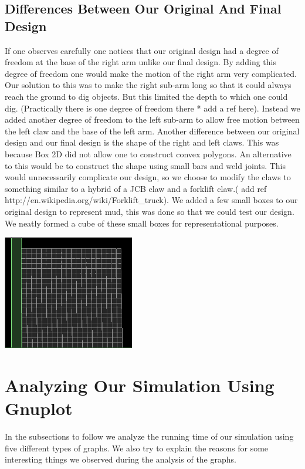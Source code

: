 \documentclass[11pt]{article}
\begin{document}
	\subsection{Differences Between Our Original And Final Design}
	If one observes carefully one notices that our original design had a degree of freedom at the base of the right arm unlike our final design. By adding this degree of freedom one would make the motion of the right arm very complicated. Our solution to this was to make the right sub-arm long so that it could always reach the ground to dig objects. But this limited the depth to which one could dig.
(Practically there is one degree of freedom there * add a ref here). Instead we added another degree of freedom to the left sub-arm to allow free motion between the left claw and the base of the left arm.\newline
	Another difference between our original design and our final design is the shape of the right and left claws. This was because Box 2D did not allow one to construct convex polygons. An alternative to this would be to construct the shape using small bars and weld joints. This would unnecessarily complicate our design, so we choose to modify the claws to something similar to a hybrid of a JCB claw and a forklift claw.( add ref http://en.wikipedia.org/wiki/Forklift\_truck).\newline
	 We added a few small boxes to our original design to represent mud, this was done so that we could test our design. We neatly formed a cube of these small boxes for representational purposes.
	\begin{center}\includegraphics[height=5cm]{Boxes.png}\end{center}
\section{Analyzing Our Simulation Using Gnuplot}
	In the subsections to follow we analyze the running time of our simulation using five different types of graphs. We also try to explain the reasons for some interesting things we observed during the analysis of the graphs. 
\end{document}
